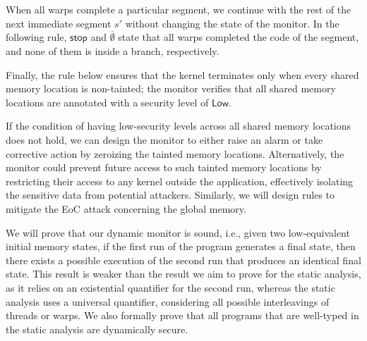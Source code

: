 When all warps complete a particular segment, we continue with the rest of the next immediate segment $s'$ without changing the state of the monitor. In the following rule, $\mathsf{stop}$ and $\overline{\emptyset}$ state that all warps completed the code of the segment, and none of them is inside a branch, respectively. 
{\small \begin{mathpar}
\end{mathpar}
}
Finally, the rule below ensures that the kernel terminates only when every shared memory location is non-tainted; the monitor verifies that all shared memory locations are annotated with a security level of $\mathsf{Low}$.

{\small\begin{mathpar}
\end{mathpar}
}

If the condition of having low-security levels across all shared memory locations does not hold, we can design the monitor to either raise an alarm or take corrective action by zeroizing the tainted memory locations. 
%
Alternatively, the monitor could prevent future access to such tainted memory locations by restricting their access to any kernel outside the application, effectively isolating the sensitive data from potential attackers.
%
Similarly, we will design rules to mitigate the EoC attack concerning the global memory.


We will prove that our dynamic monitor is sound, i.e., given two low-equivalent initial memory states, if the first run of the program generates a final state, then there exists a possible execution of the second run that produces an identical final state. 
%
This result is weaker than the result we aim to prove for the static analysis, as it relies on an existential quantifier for the second run, whereas the static analysis uses a universal quantifier, considering all possible interleavings of threads or warps.
%
We also formally prove that all programs that are well-typed in the static analysis are dynamically secure.


